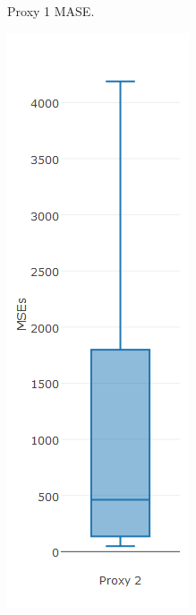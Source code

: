 \begin{figure}[!h]
{\begin{subfigure}{.25\linewidth}
  \caption{Proxy 1 MASE.}
  \label{fig:bp2.2c}
\end{subfigure}
\begin{subfigure}{.25\linewidth}
  \centering
  \includegraphics[width=\linewidth]{img/10ymaMsebpNaive.png}

\end{subfigure}}
\end{figure}
